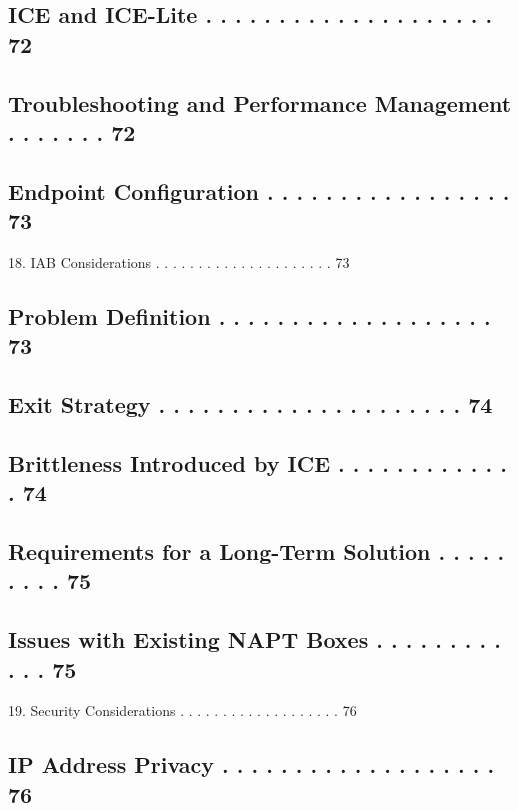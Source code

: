 \documentclass{article}
\begin{document}
\subsection{ICE and ICE-Lite . . . . . . . . . . . . . . . . . . . .  72}

\subsection{Troubleshooting and Performance Management . . . . . . .  72}

\subsection{Endpoint Configuration . . . . . . . . . . . . . . . . .  73}

18. IAB Considerations  . . . . . . . . . . . . . . . . . . . . .  73

\subsection{Problem Definition . . . . . . . . . . . . . . . . . . .  73}

\subsection{Exit Strategy  . . . . . . . . . . . . . . . . . . . . .  74}

\subsection{Brittleness Introduced by ICE  . . . . . . . . . . . . .  74}

\subsection{Requirements for a Long-Term Solution  . . . . . . . . .  75}

\subsection{Issues with Existing NAPT Boxes  . . . . . . . . . . . .  75}

19. Security Considerations . . . . . . . . . . . . . . . . . . .  76

\subsection{IP Address Privacy . . . . . . . . . . . . . . . . . . .  76}
\end{document}
